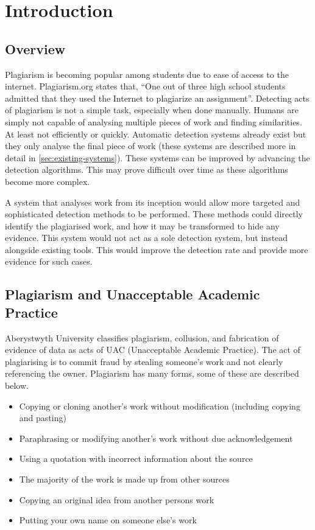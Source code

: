 \chapter{Introduction}
\section{Overview}
Plagiarism is becoming popular among students due to ease of access to the internet. Plagiarism.org states that, ``One out of three high school students admitted that they used the Internet to plagiarize an assignment''\cite{PlagiarismorgFacts}. Detecting acts of plagiarism is not a simple task, especially when done manually. Humans are simply not capable of analysing multiple pieces of work and finding similarities. At least not efficiently or quickly. Automatic detection systems already exist but they only analyse the final piece of work (these systems are described more in detail in \autoref{sec:existing-systems}). These systems can be improved by advancing the detection algorithms. This may prove difficult over time as these algorithms become more complex.

A system that analyses work from its inception would allow more targeted and sophisticated detection methods to be performed. These methods could directly identify the plagiarised work, and how it may be transformed to hide any evidence. This system would not act as a sole detection system, but instead alongside existing tools. This would improve the detection rate and provide more evidence for such cases.

\section{Plagiarism and Unacceptable Academic Practice}
Aberystwyth University classifies plagiarism, collusion, and fabrication of evidence of data as acts of UAC (Unacceptable Academic Practice)\cite{AberUniUAC}. The act of plagiarising is to commit fraud by stealing someone's work and not clearly referencing the owner\cite{PlagiarismorgWhat}. Plagiarism has many forms, some of these are described below\cite{AberUniUAC}\cite{PlagiarismorgWhat}\cite{TurnitinPlagiarismSpectrum}\cite{Clough03oldand}.

\begin{itemize}
  \item Copying or cloning another's work without modification (including copying and pasting)
  \item Paraphrasing or modifying another's work without due acknowledgement
  \item Using a quotation with incorrect information about the source
  \item The majority of the work is made up from other sources
  \item Copying an original idea from another persons work
  \item Putting your own name on someone else's work  
\end{itemize}

